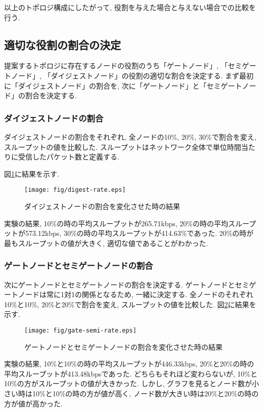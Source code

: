 以上のトポロジ構成にしたがって, 役割を与えた場合と与えない場合での比較を行う.

\newpage

\subsection{適切な役割の割合の決定}
提案するトポロジに存在するノードの役割のうち「ゲートノード」, 「セミゲートノード」, 「ダイジェストノード」の役割の適切な割合を決定する. まず最初に「ダイジェストノード」の割合を, 次に「ゲートノード」と「セミゲートノード」の割合を決定する.

\subsubsection{ダイジェストノードの割合}
ダイジェストノードの割合をそれぞれ, 全ノードの10\%, 20\%, 30\%で割合を変え, スループットの値を比較した. スループットはネットワーク全体で単位時間当たりに受信したパケット数と定義する.

図\ref{fig:digest-rate}に結果を示す.

\begin{figure}[h]
  \centering
  \texttt{[image: fig/digest-rate.eps]}
  \caption{ダイジェストノードの割合を変化させた時の結果}
  \label{fig:digest-rate}
\end{figure}

実験の結果, 10\%の時の平均スループットが265.71kbps, 20\%の時の平均スループットが573.12kbps, 30\%の時の平均スループットが414.63\%であった. 20\%の時が最もスループットの値が大きく, 適切な値であることがわかった.

\subsubsection{ゲートノードとセミゲートノードの割合}
次にゲートノードとセミゲートノードの割合を決定する. ゲートノードとセミゲートノードは常に1対1の関係となるため, 一緒に決定する. 全ノードのそれぞれ10\%と10\%, 20\%と20\%で割合を変え, スループットの値を比較した. 図\ref{fig:gate-semi-rate}に結果を示す.

\begin{figure}[h]
  \centering
  \texttt{[image: fig/gate-semi-rate.eps]}
  \caption{ゲートノードとセミゲートノードの割合を変化させた時の結果}
  \label{fig:gate-semi-rate}
\end{figure}

実験の結果, 10\%と10\%の時の平均スループットが446.33kbps, 20\%と20\%の時の平均スループットが413.48kbpsであった. どちらもそれほど変わらないが, 10\%と10\%の方がスループットの値が大きかった. しかし, グラフを見るとノード数が小さい時は10\%と10\%の時の方が値が高く, ノード数が大きい時は20\%と20\%の時の方が値が高かった.

